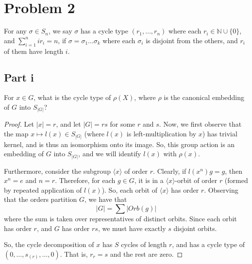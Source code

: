 \documentclass[12pt,reqno]{amsart}
\newcommand{\N}{\mathbb{N}}
\begin{document}
\newpage

\section*{Problem 2}
For any $\sigma\in S_n$, we say $\sigma$ has a cycle type
$(r_1,\ldots,r_n)$ where each $r_i\in \N\cup\{0\}$, and $\sum_{i=1}^nir_i = n$,
if $\sigma = \sigma_1\ldots\sigma_k$ where each $\sigma_i$ is disjoint from the
others, and $r_i$ of them have length $i$.

\subsection*{Part i}
For $x\in G$, what is the cycle type of $\rho(X)$, where $\rho$ is the canonical
embedding of $G$ into $S_{|G|}$?
\\
\begin{proof}
    Let $|x| = r$, and let $|G| = rs$ for some $r$ and $s$. Now, we first
    observe that the map $x\mapsto l(x)\in S_{|G|}$ (where $l(x)$ is left-multiplication by
    $x$) has trivial kernel, and is thus an isomorphism onto its image.
    So, this group action is an embedding of $G$ into $S_{|G|}$, and we will
    identify $l(x)$ with $\rho(x)$.

    Furthermore, consider the subgroup $\langle x\rangle$ of order $r$.
    Clearly, if $l(x^n)g=g$, then $x^n = e$ and $n=r$. Therefore, for each
    $g\in G$, it is in a $\langle x\rangle$-orbit of order $r$ (formed by
    repeated application of $l(x)$). So, each orbit of $\langle x\rangle$ has
    order $r$. Observing that the orders partition $G$, we have that
    \[
        |G| = \sum|Orb(g)|
    \]
    where the sum is taken over representatives of distinct orbits. Since 
    each orbit has order $r$, and $G$ has order $rs$, we must have exactly $s$
    disjoint orbits.

    So, the cycle decomposition of $x$ has $S$ cycles of length $r$,
    and has a cycle type of $(0,\ldots,s_{(r)},\ldots,0)$. That is,
    $r_r = s$ and the rest are zero.
\end{proof}
\end{document}
